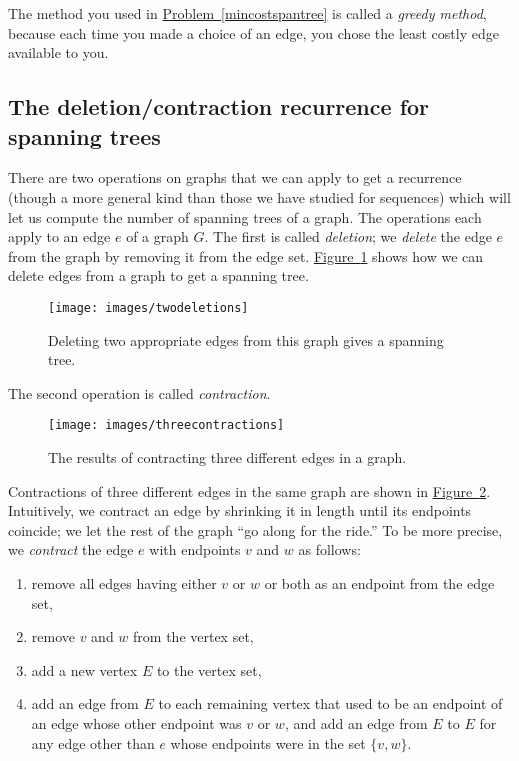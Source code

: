 \documentclass[10pt,]{book}
\theoremstyle{plain}
\theoremstyle{definition}
\numberwithin{equation}{chapter}
\begin{document}
The method you used in \hyperref[mincostspantree]{Problem~\ref{mincostspantree}} is called a \emph{greedy method}, because each time you made a choice of an edge, you chose the least costly edge available to you.%
\typeout{************************************************}
\typeout{************************************************}
\subsection[{The deletion/contraction recurrence for spanning trees}]{The deletion/contraction recurrence for spanning trees}\label{subsection-26}
There are two operations on graphs that we can apply to get a recurrence (though a more general kind than those we have studied for sequences) which will let us compute the number of spanning trees of a graph. The operations each apply to an edge \(e\) of a graph \(G\). The first is called \emph{deletion}; we \emph{delete} the edge \(e\) from the graph by removing it from the edge set. \hyperref[twodeletions]{Figure~\ref{twodeletions}} shows how we can delete edges from a graph to get a spanning tree.%
\begin{figure}
\centering
\texttt{[image: images/twodeletions]}
\caption{Deleting two appropriate edges from this graph gives a spanning tree.\label{twodeletions}}
\end{figure}
The second operation is called \emph{contraction}.%
\begin{figure}
\centering
\texttt{[image: images/threecontractions]}
\caption{The results of contracting three different edges in a graph.\label{threecontractions}}
\end{figure}
Contractions of three different edges in the same graph are shown in \hyperref[threecontractions]{Figure~\ref{threecontractions}}. Intuitively, we contract an edge by shrinking it in length until its endpoints coincide; we let the rest of the graph ``go along for the ride.'' To be more precise, we \emph{contract} the edge \(e\) with endpoints \(v\) and \(w\) as follows: \leavevmode%
\begin{enumerate}
\item\hypertarget{li-30}{}remove all edges having either \(v\) or \(w\) or both as an endpoint from the edge set,%
\item\hypertarget{li-31}{}remove \(v\) and \(w\) from the vertex set,%
\item\hypertarget{li-32}{}add a new vertex \(E\) to the vertex set,%
\item\hypertarget{li-33}{}add an edge from \(E\) to each remaining vertex that used to be an endpoint of an edge whose other endpoint was \(v\) or \(w\), and add an edge from \(E\) to \(E\) for any edge other than \(e\) whose endpoints were in the set \(\{v,w\}\).%
\end{enumerate}
\end{document}
